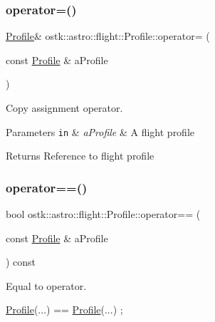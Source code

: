 \subsubsection{\texorpdfstring{operator=()}{operator=()}}
{\footnotesize\ttfamily \hyperlink{classostk_1_1astro_1_1flight_1_1_profile}{Profile}\& ostk\+::astro\+::flight\+::\+Profile\+::operator= (\begin{DoxyParamCaption}\item[{const \hyperlink{classostk_1_1astro_1_1flight_1_1_profile}{Profile} \&}]{a\+Profile }\end{DoxyParamCaption})\hspace{0.3cm}{\ttfamily [default]}}



Copy assignment operator. 


\begin{DoxyParams}[1]{Parameters}
\mbox{\tt in}  & {\em a\+Profile} & A flight profile \\
\hline
\end{DoxyParams}
\begin{DoxyReturn}{Returns}
Reference to flight profile 
\end{DoxyReturn}
\mbox{\label{classostk_1_1astro_1_1flight_1_1_profile_a46b1c71a5a58ddf87f82b073ec651ea6}} 
\subsubsection{\texorpdfstring{operator==()}{operator==()}}
{\footnotesize\ttfamily bool ostk\+::astro\+::flight\+::\+Profile\+::operator== (\begin{DoxyParamCaption}\item[{const \hyperlink{classostk_1_1astro_1_1flight_1_1_profile}{Profile} \&}]{a\+Profile }\end{DoxyParamCaption}) const}



Equal to operator. 


\begin{DoxyCode}
\hyperlink{classostk_1_1astro_1_1flight_1_1_profile_a80fbc6a3773a6f2790b84c4ddb306d07}{Profile}(...) == \hyperlink{classostk_1_1astro_1_1flight_1_1_profile_a80fbc6a3773a6f2790b84c4ddb306d07}{Profile}(...) ;
\end{DoxyCode}



